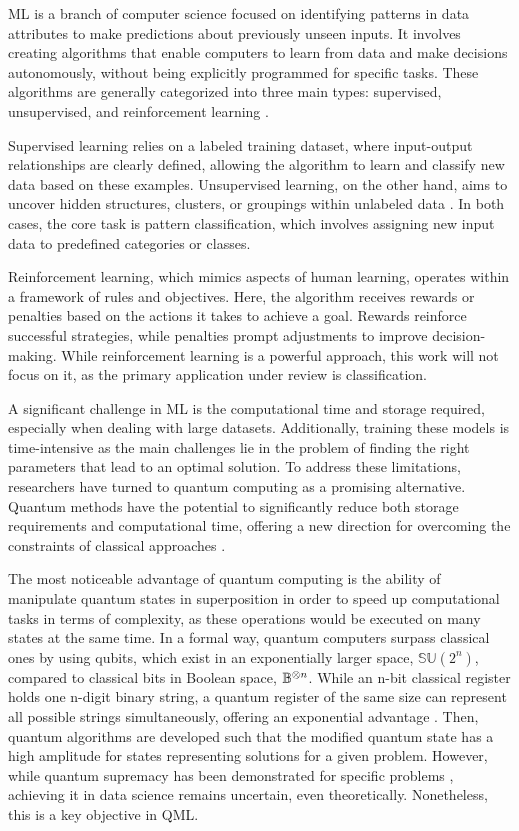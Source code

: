 \documentclass{article}
\begin{document}
ML is a branch of computer science focused on identifying patterns in data attributes to make predictions about previously unseen inputs. 
It involves creating algorithms that enable computers to learn from data and make decisions autonomously, without being explicitly programmed for specific tasks. 
These algorithms are generally categorized into three main types: supervised, unsupervised, and reinforcement learning \cite{Ayodele10}.

Supervised learning relies on a labeled training dataset, where input-output relationships are clearly defined, allowing the algorithm to learn and classify new data based on these examples. 
Unsupervised learning, on the other hand, aims to uncover hidden structures, clusters, or groupings within unlabeled data \cite{10047618}. 
In both cases, the core task is pattern classification, which involves assigning new input data to predefined categories or classes.

Reinforcement learning, which mimics aspects of human learning, operates within a framework of rules and objectives. 
Here, the algorithm receives rewards or penalties based on the actions it takes to achieve a goal. 
Rewards reinforce successful strategies, while penalties prompt adjustments to improve decision-making. 
While reinforcement learning is a powerful approach, this work will not focus on it, as the primary application under review is classification.

A significant challenge in ML is the computational time and storage required, especially when dealing with large datasets. 
Additionally, training these models is time-intensive as the main challenges lie in the problem of finding the right parameters that lead to an optimal solution. 
To address these limitations, researchers have turned to quantum computing as a promising alternative. 
Quantum methods have the potential to significantly reduce both storage requirements and computational time, offering a new direction for overcoming the 
constraints of classical approaches \cite{degruyterIntroductionQuantum}.

The most noticeable advantage of quantum computing is the ability of manipulate quantum states in superposition in order to speed up computational tasks in terms 
of complexity, as these operations would be executed on many states at the same time. In a formal way, quantum computers surpass classical ones by using qubits, 
which exist in an exponentially larger space, $\mathbb{SU}(2^n)$, compared to classical bits in Boolean space, $\mathbb{B}^{\tens{} n} $. 
While an n-bit classical register holds one n-digit binary string, a quantum register of the same size can represent all possible strings simultaneously, 
offering an exponential advantage \cite{Nielsen_Chuang_2010}. Then, quantum algorithms are developed such that the modified quantum state has a high amplitude 
for states representing solutions for a given problem. 
However, while quantum supremacy has been demonstrated for specific problems \cite{Arute2019}, achieving it in data science remains uncertain, even theoretically. 
Nonetheless, this is a key objective in QML.
\end{document}
